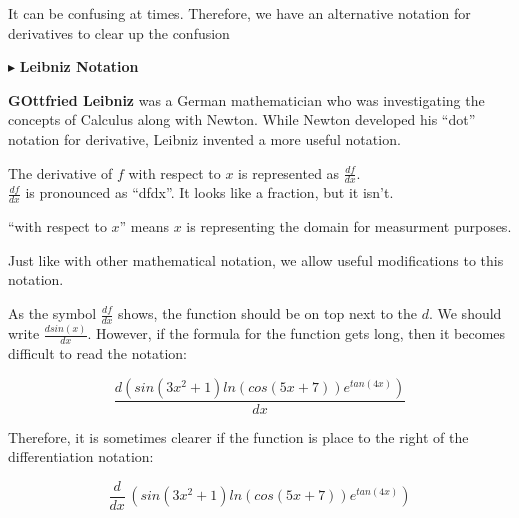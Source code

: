 \documentclass{ximera}
\begin{document}
It can be confusing at times.  Therefore, we have an alternative notation for derivatives to clear up the confusion



$\blacktriangleright$  \textbf{\textcolor{purple!85!blue}{Leibniz Notation}}


\textbf{GOttfried Leibniz} was a German mathematician who was investigating the concepts of Calculus along with Newton.  While Newton developed his ``dot'' notation for derivative, Leibniz invented a more useful notation.


The derivative of $f$ with respect to $x$ is represented as $\frac{df}{dx}$. \\

$\frac{df}{dx}$ is pronounced as ``dfdx''.  It looks like a fraction, but it isn't.


``with respect to $x$'' means $x$ is representing the domain for measurment purposes. 



\begin{notation}


Just like with other mathematical notation, we allow useful modifications to this notation.



As the symbol $\frac{df}{dx}$ shows, the function should be on top next to the $d$.    We should write $\frac{d sin(x)}{dx}$.  However, if the formula for the function gets long, then it becomes difficult to read the notation:

\[
\frac{d (sin(3x^2+1)ln(cos(5x+7))e^{tan(4x)})}{dx}
\]


Therefore, it is sometimes clearer if the function is place to the right of the differentiation notation:




\[
\frac{d}{dx} \, (sin(3x^2+1)ln(cos(5x+7))e^{tan(4x)})
\]






\end{notation}
\end{document}
